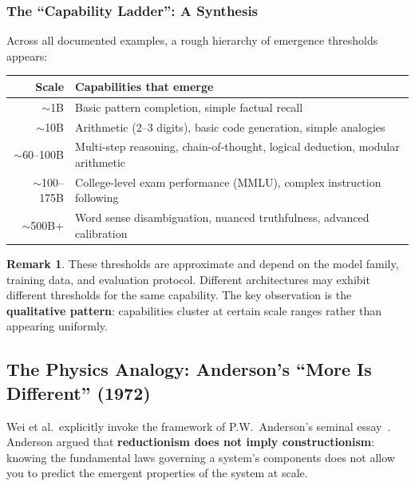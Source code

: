 \documentclass[11pt, a4paper]{article}
\theoremstyle{definition}
\newtheorem{remark}{Remark}[section]
\theoremstyle{plain}
\begin{document}
\subsubsection{The ``Capability Ladder'': A Synthesis}

Across all documented examples, a rough hierarchy of emergence thresholds appears:

\begin{center}
\begin{tabular}{rp{9cm}}
  \toprule
  \textbf{Scale} & \textbf{Capabilities that emerge} \\
  \midrule
  ${\sim}$1B & Basic pattern completion, simple factual recall \\
  ${\sim}$10B & Arithmetic (2--3 digits), basic code generation, simple analogies \\
  ${\sim}$60--100B & Multi-step reasoning, chain-of-thought, logical deduction, modular arithmetic \\
  ${\sim}$100--175B & College-level exam performance (MMLU), complex instruction following \\
  ${\sim}$500B+ & Word sense disambiguation, nuanced truthfulness, advanced calibration \\
  \bottomrule
\end{tabular}
\end{center}

\begin{remark}
These thresholds are approximate and depend on the model family, training data, and evaluation protocol. Different architectures may exhibit different thresholds for the same capability. The key observation is the \textbf{qualitative pattern}: capabilities cluster at certain scale ranges rather than appearing uniformly.
\end{remark}

\subsection{The Physics Analogy: Anderson's ``More Is Different'' (1972)}
\label{subsec:anderson}

Wei et al.\ explicitly invoke the framework of P.W.~Anderson's seminal essay~\cite{anderson1972more}. Anderson argued that \textbf{reductionism does not imply constructionism}: knowing the fundamental laws governing a system's components does not allow you to predict the emergent properties of the system at scale.
\end{document}
